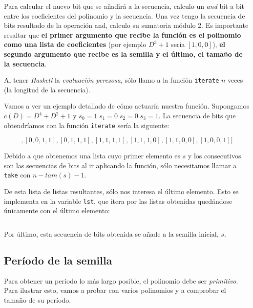 \documentclass[10pt,spanish]{article}
\begin{document}
Para calcular el nuevo bit que se añadirá a la secuencia, calculo un \textit{\textcolor{azul}{and}} bit a bit entre los coeficientes del polinomio y la secuencia. Una vez tengo la secuencia de bits resultado de la operación and, calculo su sumatoria módulo 2. Es importante resaltar que \textbf{\textcolor{azul}{el primer argumento que recibe la función es el polinomio como una lista de coeficientes}} (por ejemplo $D^3 + 1$ sería $[1,0,0]$), \textbf{\textcolor{azul}{el segundo argumento que recibe es la semilla y el último, el tamaño de la secuencia}}.

Al tener \textit{\textcolor{azul}{Haskell}} la \textit{\textcolor{azul}{evaluación perezosa}}, sólo llamo a la función \texttt{iterate} $n$ veces (la longitud de la secuencia).

Vamos a ver un ejemplo detallado de cómo actuaría nuestra función. Supongamos $c(D) = D^4 + D^2 + 1$ y $s_0 = 1 \; s_1 = 0 \; s_2 = 0 \; s_3 = 1$. La secuencia de bits que obtendríamos con la función \texttt{iterate} sería la siguiente:

\begin{displaymath}
[[1,0,0,1],[0,0,1,1],[0,1,1,1],[1,1,1,1],[1,1,1,0],[1,1,0,0],[1,0,0,1]]
\end{displaymath}

Debido a que obtenemos una lista cuyo primer elemento es $s$ y los consecutivos son las secuencias de bits al ir aplicando la función, sólo necesitamos llamar a \texttt{take} con $n - tam(s)-1$. 

De esta lista de listas resultantes, sólo nos interesa el último elemento. Esto se implementa en la variable \texttt{lst}, que itera por las listas obtenidas quedándose únicamente con el último elemento:

\begin{displaymath}
[1,1,1,0,0,1]
\end{displaymath}

Por último, esta secuencia de bits obtenida se añade a la semilla inicial, $s$.

\subsection{\textcolor{azul}Período de la semilla}
Para obtener un período lo más largo posible, el polinomio debe ser \textit{\textcolor{azul}{primitivo}}. Para ilustrar esto, vamos a probar con varios polinomios y a comprobar el tamaño de su período.
\end{document}
